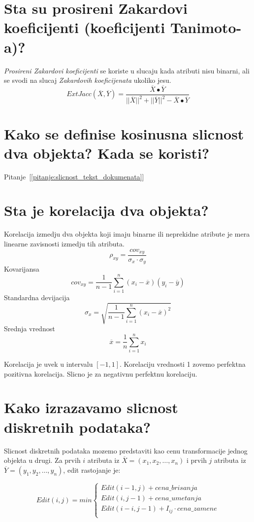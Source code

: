 \documentclass[a4paper]{article}
\begin{document}
\section{Sta su prosireni Zakardovi koeficijenti (koeficijenti Tanimoto-a)?}
\emph{Prosireni Zakardovi koeficijenti} se koriste u slucaju kada atributi nisu binarni, ali se
svodi na slucaj \emph{Zakardovih koeficijenata} ukoliko jesu.
\begin{equation}\label{eq:prosireni_zakard_tanimoto}
    ExtJacc(\overline{X},\overline{Y}) =
    \dfrac{
        \overline{X} \bullet \overline{Y}
    }{
        ||\overline{X}||^2 + ||\overline{Y}||^2
        - \overline{X} \bullet \overline{Y}
    }
\end{equation}

\section{Kako se definise kosinusna slicnost dva objekta? Kada se koristi?}

Pitanje~[\ref{pitanje:slicnost_tekst_dokumenata}]

\section{Sta je korelacija dva objekta?}
Korelacija izmedju dva objekta koji imaju binarne ili neprekidne atribute je mera linearne
zavisnosti izmedju tih atributa.
\[
    \rho_{xy} = \dfrac{cov_{xy}}{\sigma_x \cdot \sigma_y}
\]
Kovarijansa
\[
    cov_{xy} = \dfrac{1}{n-1}\sum_{i=1}^{n} (x_i - \overline{x})(y_i - \overline{y})
\]
Standardna devijacija
\[
    \sigma_x = \sqrt{\dfrac{1}{n-1}\sum_{i=1}^{n} (x_i - \overline{x})^2}
\]
Srednja vrednost
\[
    \overline{x} = \dfrac{1}{n}\sum_{i=1}^{n} x_i
\]

Korelacija je uvek u intervalu \([-1,1]\). Korelaciju vrednosti 1 zovemo perfektna pozitivna
korelacija. Slicno je za negativnu perfektnu korelaciju.


\section{Kako izrazavamo slicnost diskretnih podataka?}
Slicnost diskretnih podataka mozemo predstaviti kao cenu transformacije jednog objekta u drugi.
Za prvih \(i\) atributa iz \(\overline{X}=(x_1,x_2,\ldots,x_n)\) i prvih \(j\) atributa iz
\(\overline{Y}=(y_1,y_2,\ldots,y_n)\), edit rastojanje je:

\begin{equation}\label{eq:edit_distance}
    Edit(i, j) = min
    \begin{cases}
        Edit(i-1, j) + cena\_brisanja \\
        Edit(i, j-1) + cena\_umetanja \\
        Edit(i-i, j-1) + I_{ij} \cdot cena\_zamene \\
    \end{cases}
\end{equation}
\end{document}

